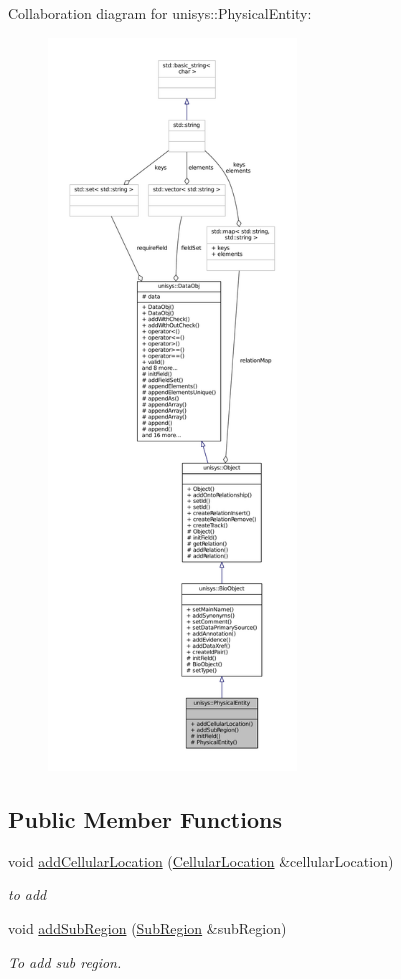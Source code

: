 Collaboration diagram for unisys\-:\-:Physical\-Entity\-:
\nopagebreak
\begin{figure}[H]
\begin{center}
\leavevmode
\includegraphics[height=550pt]{classunisys_1_1PhysicalEntity__coll__graph}
\end{center}
\end{figure}
\subsection*{Public Member Functions}
\begin{DoxyCompactItemize}
\item 
void \hyperlink{classunisys_1_1PhysicalEntity_a7cec88530e9e30103eaa5eed9165e058}{add\-Cellular\-Location} (\hyperlink{classunisys_1_1CellularLocation}{Cellular\-Location} \&cellular\-Location)
\begin{DoxyCompactList}\small\item\em to add \end{DoxyCompactList}\item 
void \hyperlink{classunisys_1_1PhysicalEntity_a5bee6de7bbe9e813788731bf9b3d5abf}{add\-Sub\-Region} (\hyperlink{classunisys_1_1SubRegion}{Sub\-Region} \&sub\-Region)
\begin{DoxyCompactList}\small\item\em To add sub region. \end{DoxyCompactList}\end{DoxyCompactItemize}
